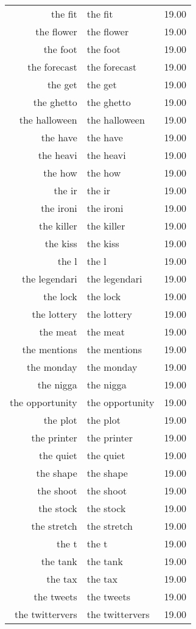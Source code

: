 \begin{table}[ht]
\begin{tabular}{rlr}
  the fit & the fit & 19.00 \\ 
  the flower & the flower & 19.00 \\ 
  the foot & the foot & 19.00 \\ 
  the forecast & the forecast & 19.00 \\ 
  the get & the get & 19.00 \\ 
  the ghetto & the ghetto & 19.00 \\ 
  the halloween & the halloween & 19.00 \\ 
  the have & the have & 19.00 \\ 
  the heavi & the heavi & 19.00 \\ 
  the how & the how & 19.00 \\ 
  the ir & the ir & 19.00 \\ 
  the ironi & the ironi & 19.00 \\ 
  the killer & the killer & 19.00 \\ 
  the kiss & the kiss & 19.00 \\ 
  the l & the l & 19.00 \\ 
  the legendari & the legendari & 19.00 \\ 
  the lock & the lock & 19.00 \\ 
  the lottery & the lottery & 19.00 \\ 
  the meat & the meat & 19.00 \\ 
  the mentions & the mentions & 19.00 \\ 
  the monday & the monday & 19.00 \\ 
  the nigga & the nigga & 19.00 \\ 
  the opportunity & the opportunity & 19.00 \\ 
  the plot & the plot & 19.00 \\ 
  the printer & the printer & 19.00 \\ 
  the quiet & the quiet & 19.00 \\ 
  the shape & the shape & 19.00 \\ 
  the shoot & the shoot & 19.00 \\ 
  the stock & the stock & 19.00 \\ 
  the stretch & the stretch & 19.00 \\ 
  the t & the t & 19.00 \\ 
  the tank & the tank & 19.00 \\ 
  the tax & the tax & 19.00 \\ 
  the tweets & the tweets & 19.00 \\ 
  the twittervers & the twittervers & 19.00 \\ 

\end{tabular}
\end{table}
